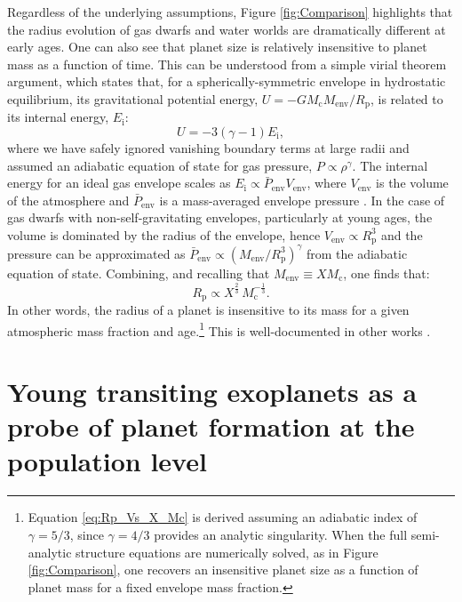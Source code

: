 \documentclass[fleqn,usenatbib]{mnras}
\begin{document}
Regardless of the underlying assumptions, Figure \ref{fig:Comparison} highlights that the radius evolution of gas dwarfs and water worlds are dramatically different at early ages. One can also see that planet size is relatively insensitive to planet mass as a function of time. This can be understood from a simple virial theorem argument, which states that, for a spherically-symmetric envelope in hydrostatic equilibrium, its gravitational potential energy, $U = - GM_\text{c} M_\text{env} / R_\text{p}$, is related to its internal energy, $E_\text{i}$:
\begin{equation}
    U = -3(\gamma-1) E_\text{i},
\end{equation}
where we have safely ignored vanishing boundary terms at large radii and assumed an adiabatic equation of state for gas pressure, $P\propto \rho^\gamma$. The internal energy for an ideal gas envelope scales as $E_\text{i} \propto \bar{P}_\text{env}V_\text{env}$, where $V_\text{env}$ is the volume of the atmosphere and $\bar{P}_\text{env}$ is a mass-averaged envelope pressure \citep[e.g.][]{kippenhahn2012stellar}. In the case of gas dwarfs with non-self-gravitating envelopes, particularly at young ages, the volume is dominated by the radius of the envelope, hence $V_\text{env} \propto R_\text{p}^3$ and the pressure can be approximated as $\bar{P}_\text{env} \propto (M_\text{env} / R_\text{p}^3)^\gamma$ from the adiabatic equation of state. Combining, and recalling that $M_\text{env} \equiv XM_\text{c}$, one finds that:
\begin{equation} \label{eq:Rp_Vs_X_Mc}
    R_\text{p} \propto X^\frac{2}{3} \, M_\text{c}^{-\frac{1}{3}}.
\end{equation}
In other words, the radius of a planet is insensitive to its mass for a given atmospheric mass fraction and age.\footnote{Equation \ref{eq:Rp_Vs_X_Mc} is derived assuming an adiabatic index of $\gamma = 5/3$, since $\gamma=4/3$ provides an analytic singularity. When the full semi-analytic structure equations are numerically solved, as in Figure \ref{fig:Comparison}, one recovers an insensitive planet size as a function of planet mass for a fixed envelope mass fraction.} This is well-documented in other works \citep[see Figure 1 from][]{Lopez2014}.

\section{Young transiting exoplanets as a probe of planet formation at the population level} \label{sec:populationlevel}
\end{document}

